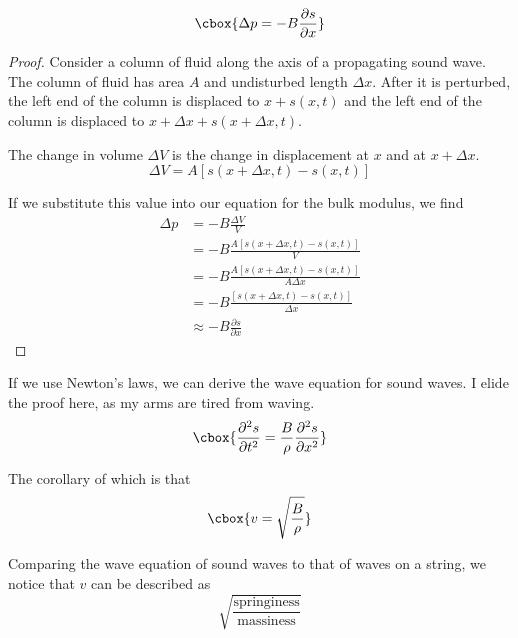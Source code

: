 \documentclass{hw}
\begin{document}
\begin{lemma}
\[\cbox{
  \Delta p = -B \frac{\partial s}{\partial x}
}\]
\begin{proof}
Consider a column of fluid along the axis of a propagating sound wave. The
column of fluid has area $A$ and undisturbed length $\Delta x$. After it is
perturbed, the left end of the column is displaced to $x + s(x,t)$ and the left
end of the column is displaced to $x + \Delta x + s(x + \Delta x, t)$.

The change in volume $\Delta V$ is the change in displacement at $x$ and at $x
+ \Delta x$.
\[
  \Delta V = A[s(x + \Delta x, t) - s(x, t)]
\]

If we substitute this value into our equation for the bulk modulus, we find
\begin{align*}
  \Delta p &= -B \frac{\Delta V}{V} \\
           &= -B \frac{A[s(x + \Delta x, t) - s(x, t)]}{V} \\
           &= -B \frac{A[s(x + \Delta x, t) - s(x, t)]}{A \Delta x} \\
           &= -B \frac{[s(x + \Delta x, t) - s(x, t)]}{\Delta x} \\
           &\approx -B \frac{\partial s}{\partial x}
\end{align*}
\end{proof}
\end{lemma}

If we use Newton's laws, we can derive the wave equation for sound waves. I
elide the proof here, as my arms are tired from waving.
\[\cbox{
  \frac{\partial^2 s}{\partial t^2} = \frac{B}{\rho} \frac{\partial^2 s}{\partial x^2} 
}\]

The corollary of which is that 
\[\cbox{
  v = \sqrt{\frac{B}{\rho}}
}\]

Comparing the wave equation of sound waves to that of waves on a string, we
notice that $v$ can be described as
\[
  \sqrt{\frac{\text{springiness}}{\text{massiness}}}
\]

\end{document}
